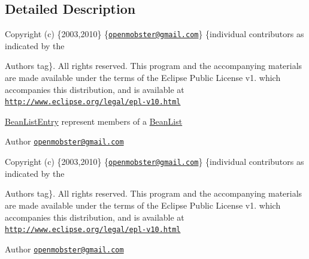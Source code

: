 \subsection{\-Detailed \-Description}
\-Copyright (c) \{2003,2010\} \{\href{mailto:openmobster@gmail.com}{\tt openmobster@gmail.\-com}\} \{individual contributors as indicated by the \begin{DoxyAuthor}{\-Authors}
tag\}. \-All rights reserved. \-This program and the accompanying materials are made available under the terms of the \-Eclipse \-Public \-License v1. which accompanies this distribution, and is available at \href{http://www.eclipse.org/legal/epl-v10.html}{\tt http\-://www.\-eclipse.\-org/legal/epl-\/v10.\-html}
\end{DoxyAuthor}
\hyperlink{interface_bean_list_entry}{\-Bean\-List\-Entry} represent members of a \hyperlink{interface_bean_list}{\-Bean\-List} \begin{DoxyAuthor}{\-Author}
\href{mailto:openmobster@gmail.com}{\tt openmobster@gmail.\-com}
\end{DoxyAuthor}
\-Copyright (c) \{2003,2010\} \{\href{mailto:openmobster@gmail.com}{\tt openmobster@gmail.\-com}\} \{individual contributors as indicated by the \begin{DoxyAuthor}{\-Authors}
tag\}. \-All rights reserved. \-This program and the accompanying materials are made available under the terms of the \-Eclipse \-Public \-License v1. which accompanies this distribution, and is available at \href{http://www.eclipse.org/legal/epl-v10.html}{\tt http\-://www.\-eclipse.\-org/legal/epl-\/v10.\-html}
\end{DoxyAuthor}
\begin{DoxyAuthor}{\-Author}
\href{mailto:openmobster@gmail.com}{\tt openmobster@gmail.\-com} 
\end{DoxyAuthor}



